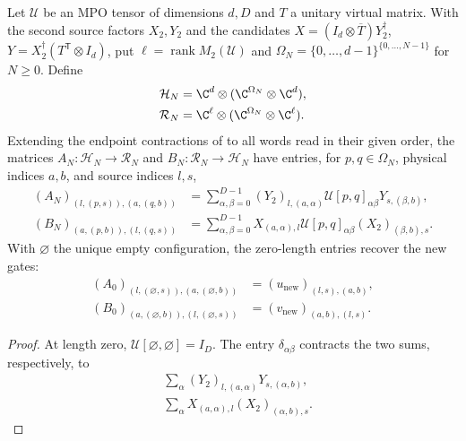 \begin{definition}
    \label{def:mpug_inverse_word_endpoints}
    \leanok
    Let $\mathcal U$ be an MPO tensor of dimensions $d,D$ and $T$ a
    unitary virtual matrix. With the second source factors $X_2,Y_2$
    and the candidates $X=(I_d\otimes\overline T)Y_2^\dagger$,
    $Y=X_2^\dagger(T^{\mathsf T}\otimes I_d)$, put
    $\ell=\operatorname{rank}M_2(\mathcal U)$ and
    $\Omega_N=\{0,\ldots,d-1\}^{\{0,\ldots,N-1\}}$ for $N\geq0$.
    Define
    \begin{align}
        \mathcal H_N & =\C^d\otimes(\C^{\Omega_N}\otimes\C^d),       \\
        \mathcal R_N & =\C^\ell\otimes(\C^{\Omega_N}\otimes\C^\ell).
    \end{align}
    Extending the endpoint contractions of
    \cite[lines~5444--5487]{FrancoRubio2025MPUGauging} to all words read in
    their given order, the matrices $A_N\colon\mathcal H_N\to\mathcal R_N$ and
    $B_N\colon\mathcal R_N\to\mathcal H_N$ have entries, for $p,q\in\Omega_N$,
    physical indices $a,b$, and source indices $l,s$,
    \begin{align}
        (A_N)_{(l,(p,s)),(a,(q,b))}
         & =\sum_{\alpha,\beta=0}^{D-1}(Y_2)_{l,(a,\alpha)}
        \mathcal U[p,q]_{\alpha\beta}Y_{s,(\beta,b)},       \\
        (B_N)_{(a,(p,b)),(l,(q,s))}
         & =\sum_{\alpha,\beta=0}^{D-1}X_{(a,\alpha),l}
        \mathcal U[p,q]_{\alpha\beta}(X_2)_{(\beta,b),s}.
    \end{align}
    With $\varnothing$ the unique empty configuration, the zero-length
    entries recover the new gates:
    \begin{align}
        (A_0)_{(l,(\varnothing,s)),(a,(\varnothing,b))}
         & =(u_{\mathrm{new}})_{(l,s),(a,b)}, \\
        (B_0)_{(a,(\varnothing,b)),(l,(\varnothing,s))}
         & =(v_{\mathrm{new}})_{(a,b),(l,s)}.
    \end{align}
\end{definition}
\begin{proof}\leanok
    At length zero, $\mathcal U[\varnothing,\varnothing]=I_D$.
    The entry $\delta_{\alpha\beta}$ contracts the two sums, respectively, to
    \begin{align}
         & \sum_\alpha(Y_2)_{l,(a,\alpha)}Y_{s,(\alpha,b)},  \\
         & \sum_\alpha X_{(a,\alpha),l}(X_2)_{(\alpha,b),s}.
    \end{align}
\end{proof}

